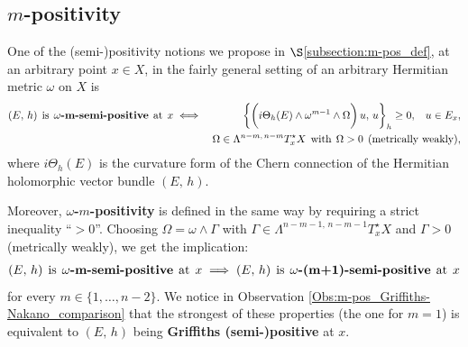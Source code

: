 \documentclass[12pt]{article}
\begin{document}
\subsection{$m$-positivity}\label{subsection:introd_m-positivity}

One of the (semi-)positivity notions we propose in $\S$\ref{subsection:m-pos_def}, at an arbitrary point $x\in X$, in the fairly general setting of an arbitrary Hermitian metric $\omega$ on $X$ is \begin{eqnarray*}(E,\,h) \hspace{1ex}\mbox{is}\hspace{1ex}  \omega\mbox{\bf -m-semi-positive}\hspace{1ex} \mbox{at}\hspace{1ex}  x & \iff & \bigg\{\bigg(i\Theta_h(E)\wedge\omega^{m-1}\wedge\Omega\bigg)\,u,\,u\bigg\}_h\geq 0, \hspace{2ex} u\in E_x, \\
  & & \Omega\in\Lambda^{n-m,\,n-m}T^\star_x X \hspace{1ex}\mbox{with}\hspace{1ex} \Omega> 0 \hspace{1ex} \mbox{(metrically weakly)},\end{eqnarray*} where $i\Theta_h(E)$ is the curvature form of the Chern connection of the Hermitian holomorphic vector bundle $(E,\,h)$.

Moreover, {\bf $\omega$-$m$-positivity} is defined in the same way by requiring a strict inequality ``$>0$''. Choosing $\Omega = \omega\wedge\Gamma$ with $\Gamma\in\Lambda^{n-m-1,\,n-m-1}T^\star_x X$ and $\Gamma>0$ (metrically weakly), we get the implication: \begin{eqnarray*}(E,\,h) \hspace{1ex}\mbox{is}\hspace{1ex}  \omega\mbox{\bf -m-semi-positive}\hspace{1ex} \mbox{at}\hspace{1ex}  x \implies (E,\,h) \hspace{1ex}\mbox{is}\hspace{1ex}  \omega\mbox{\bf -(m+1)-semi-positive}\hspace{1ex} \mbox{at}\hspace{1ex}  x\end{eqnarray*} for every $m\in\{1,\dots , n-2\}$. We notice in Observation \ref{Obs:m-pos_Griffiths-Nakano_comparison} that the strongest of these properties (the one for $m=1$) is equivalent to $(E,\,h)$ being {\bf Griffiths (semi-)positive} at $x$.
\end{document}
